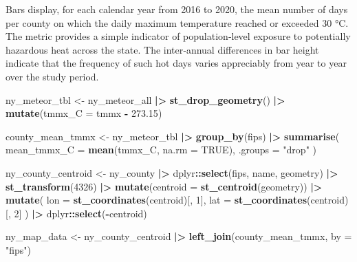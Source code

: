\documentclass[
]{article}
\newenvironment{Shaded}{\begin{snugshade}}{\end{snugshade}}
\newcommand{\AttributeTok}[1]{\textcolor[rgb]{0.13,0.29,0.53}{#1}}
\newcommand{\ConstantTok}[1]{\textcolor[rgb]{0.56,0.35,0.01}{#1}}
\newcommand{\DecValTok}[1]{\textcolor[rgb]{0.00,0.00,0.81}{#1}}
\newcommand{\FloatTok}[1]{\textcolor[rgb]{0.00,0.00,0.81}{#1}}
\newcommand{\FunctionTok}[1]{\textcolor[rgb]{0.13,0.29,0.53}{\textbf{#1}}}
\newcommand{\NormalTok}[1]{#1}
\newcommand{\OtherTok}[1]{\textcolor[rgb]{0.56,0.35,0.01}{#1}}
\newcommand{\SpecialCharTok}[1]{\textcolor[rgb]{0.81,0.36,0.00}{\textbf{#1}}}
\newcommand{\StringTok}[1]{\textcolor[rgb]{0.31,0.60,0.02}{#1}}
\begin{document}
Bars display, for each calendar year from 2016 to 2020, the mean number
of days per county on which the daily maximum temperature reached or
exceeded 30 °C. The metric provides a simple indicator of
population‑level exposure to potentially hazardous heat across the
state. The inter‑annual differences in bar height indicate that the
frequency of such hot days varies appreciably from year to year over the
study period.

\begin{Shaded}
\begin{Highlighting}[]
\NormalTok{ny\_meteor\_tbl }\OtherTok{\textless{}{-}}\NormalTok{ ny\_meteor\_all }\SpecialCharTok{|\textgreater{}}
  \FunctionTok{st\_drop\_geometry}\NormalTok{() }\SpecialCharTok{|\textgreater{}}
  \FunctionTok{mutate}\NormalTok{(}\AttributeTok{tmmx\_C =}\NormalTok{ tmmx }\SpecialCharTok{{-}} \FloatTok{273.15}\NormalTok{)}

\NormalTok{county\_mean\_tmmx }\OtherTok{\textless{}{-}}\NormalTok{ ny\_meteor\_tbl }\SpecialCharTok{|\textgreater{}}
  \FunctionTok{group\_by}\NormalTok{(fips) }\SpecialCharTok{|\textgreater{}}
  \FunctionTok{summarise}\NormalTok{(}
    \AttributeTok{mean\_tmmx\_C =} \FunctionTok{mean}\NormalTok{(tmmx\_C, }\AttributeTok{na.rm =} \ConstantTok{TRUE}\NormalTok{),}
    \AttributeTok{.groups     =} \StringTok{"drop"}
\NormalTok{  )}

\NormalTok{ny\_county\_centroid }\OtherTok{\textless{}{-}}\NormalTok{ ny\_county }\SpecialCharTok{|\textgreater{}}
\NormalTok{  dplyr}\SpecialCharTok{::}\FunctionTok{select}\NormalTok{(fips, name, geometry) }\SpecialCharTok{|\textgreater{}}
  \FunctionTok{st\_transform}\NormalTok{(}\DecValTok{4326}\NormalTok{) }\SpecialCharTok{|\textgreater{}}
  \FunctionTok{mutate}\NormalTok{(}\AttributeTok{centroid =} \FunctionTok{st\_centroid}\NormalTok{(geometry)) }\SpecialCharTok{|\textgreater{}}
  \FunctionTok{mutate}\NormalTok{(}
    \AttributeTok{lon =} \FunctionTok{st\_coordinates}\NormalTok{(centroid)[, }\DecValTok{1}\NormalTok{],}
    \AttributeTok{lat =} \FunctionTok{st\_coordinates}\NormalTok{(centroid)[, }\DecValTok{2}\NormalTok{]}
\NormalTok{  ) }\SpecialCharTok{|\textgreater{}}
\NormalTok{  dplyr}\SpecialCharTok{::}\FunctionTok{select}\NormalTok{(}\SpecialCharTok{{-}}\NormalTok{centroid)}

\NormalTok{ny\_map\_data }\OtherTok{\textless{}{-}}\NormalTok{ ny\_county\_centroid }\SpecialCharTok{|\textgreater{}}
  \FunctionTok{left\_join}\NormalTok{(county\_mean\_tmmx, }\AttributeTok{by =} \StringTok{"fips"}\NormalTok{)}
\end{Highlighting}
\end{Shaded}
\end{document}
